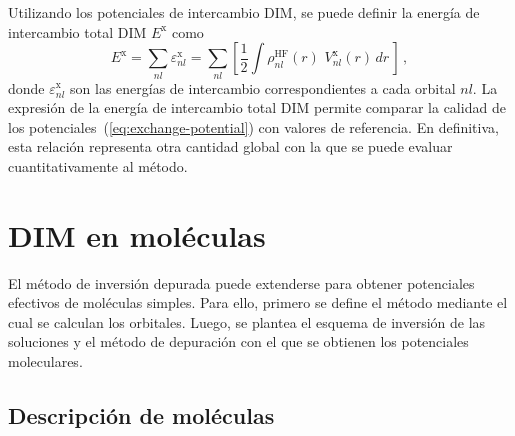 Utilizando los potenciales de intercambio DIM, se puede definir la 
energía de intercambio total DIM $E^{\mathrm{x}}$ como
\begin{equation}
E^{\mathrm{x}} = \sum_{nl}\varepsilon_{nl}^{\mathrm{x}} = 
\sum_{nl}\left[\frac{1}{2}\int{\rho^{\mathrm{HF}}_{nl}(r) \, \, 
V_{nl}^{\mathrm{x}}}(r) \, dr \, \right]\,,
\label{eq:exchange-energy}
\end{equation}
donde $\varepsilon_{nl}^{\mathrm{x}}$ son las energías de intercambio 
correspondientes a cada orbital $nl$. La expresión de la energía de 
intercambio total DIM permite comparar la calidad de los 
potenciales~(\ref{eq:exchange-potential}) con valores de referencia. En 
definitiva, esta relación representa otra cantidad global con la que se 
puede evaluar cuantitativamente al método.

\section{DIM en moléculas}
\label{sec:dimmoleculas}

El método de inversión depurada puede extenderse para obtener 
potenciales efectivos de moléculas simples. Para ello, primero se 
define el método mediante el cual se calculan los orbitales.
Luego, se plantea el esquema de inversión de las soluciones y el método 
de depuración con el que se obtienen los potenciales moleculares. 

\subsection{Descripción de moléculas}
\label{sec:moleculas}

